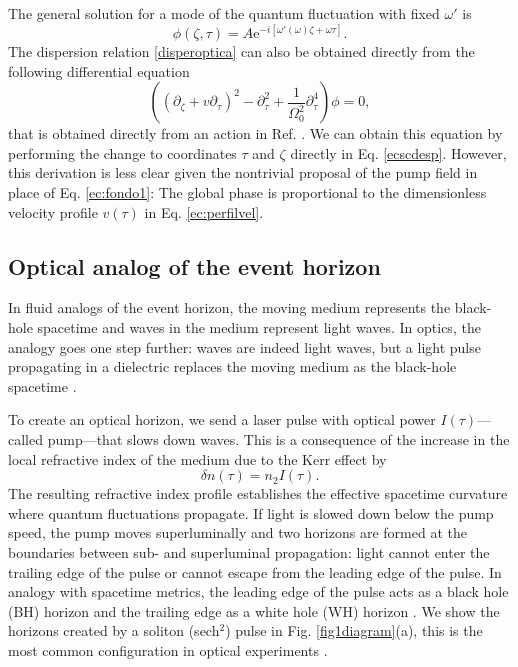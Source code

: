 \documentclass[aps,pra,reprint,amsmath,amssymb,showpacs,groupedaddress,floatfix]{revtex4-1}
\begin{document}
The general solution for a mode of the quantum fluctuation with fixed $\omega'$ is
\begin{equation}\label{econdaplana2}
\phi(\zeta,\tau)=A\text{e}^{-i[\omega'(\omega)\zeta+\omega \tau]}.
\end{equation}
The dispersion relation \eqref{disperoptica} can also be obtained directly from the following differential equation
\begin{equation}
\left(\left(\partial_{\zeta}+v\partial_{\tau}\right)^2-\partial_{\tau}^2+\frac{1}{\Omega_0^2}\partial_{\tau}^4\right)\phi=0,
\end{equation}
that is obtained directly from an action in Ref. \cite{GaonaReyes2017}. We can obtain this equation by performing the change to coordinates $\tau$ and $\zeta$ directly in Eq. \eqref{ecscdesp}. However, this derivation is less clear given the nontrivial proposal of the pump field in place of Eq. \eqref{ec:fondo1}: The global phase is proportional to the dimensionless velocity profile $v(\tau)$ in Eq. \eqref{ec:perfilvel}.
\subsection{Optical analog of the event horizon}
In fluid analogs of the event horizon, the moving medium represents the black-hole spacetime and waves in the medium represent light waves. In optics, the analogy goes one step further: waves are indeed light waves, but a light pulse propagating in a dielectric replaces the moving medium as the black-hole spacetime \cite{Bermudez2016pra}.

To create an optical horizon, we send a laser pulse with optical power $I(\tau)$---called pump---that slows down waves. This is a consequence of the increase in the local refractive index of the medium due to the Kerr effect by
\begin{equation}\label{n2}
\delta n(\tau)=n_2 I(\tau).
\end{equation}
The resulting refractive index profile establishes the effective spacetime curvature where quantum fluctuations propagate. If light is slowed down below the pump speed, the pump moves superluminally and two horizons are formed at the boundaries between sub- and superluminal propagation: light cannot enter the trailing edge of the pulse or cannot escape from the leading edge of the pulse. In analogy with spacetime metrics, the leading edge of the pulse acts as a black hole (BH) horizon and the trailing edge as a white hole (WH) horizon \cite{jacquet2019analytical, philbin2008fiber}. We show the horizons created by a soliton (sech${^2}$) pulse in Fig. \ref{fig1diagram}(a), this is the most common configuration in optical experiments \cite{philbin2008fiber,drori2019observation}.
\end{document}
